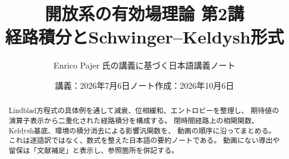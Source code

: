 \documentclass[a4paper,11pt]{ltjsarticle}
\title{\bfseries 開放系の有効場理論 第2講\\[0.5em]\large 経路積分とSchwinger--Keldysh形式}
\author{Enrico Pajer 氏の講義に基づく日本語講義ノート}
\date{講義：2026年7月6日\quad ノート作成：2026年10月6日}
\numberwithin{equation}{section}
\begin{document}
\maketitle

\begin{abstract}
Lindblad方程式の具体例を通して減衰、位相緩和、エントロピーを整理し、
期待値の演算子表示から二重化された経路積分を構成する。
閉時間経路上の相関関数、Keldysh基底、環境の積分消去による影響汎関数を、
動画の順序に沿ってまとめる。これは逐語訳ではなく、数式を整えた日本語の要約ノートである。
動画にない導出や留保は「文献補足」と表示し、参照箇所を併記する。
\end{abstract}


\hypertarget{toc}{}
\tableofcontents
\clearpage

\end{document}
